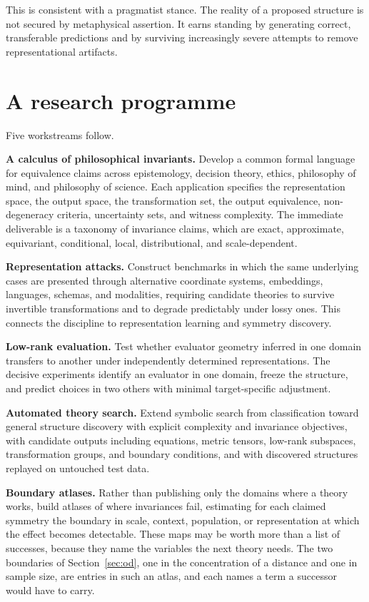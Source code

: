 \documentclass[11pt]{article}
\theoremstyle{remark}
\begin{document}
This is consistent with a pragmatist stance. The reality of a proposed structure is
not secured by metaphysical assertion. It earns standing by generating correct,
transferable predictions and by surviving increasingly severe attempts to remove
representational artifacts.

\section{A research programme}

Five workstreams follow.

\textbf{A calculus of philosophical invariants.} Develop a common formal language
for equivalence claims across epistemology, decision theory, ethics, philosophy of
mind, and philosophy of science. Each application specifies the representation
space, the output space, the transformation set, the output equivalence,
non-degeneracy criteria, uncertainty sets, and witness complexity. The immediate
deliverable is a taxonomy of invariance claims, which are exact, approximate,
equivariant, conditional, local, distributional, and scale-dependent.

\textbf{Representation attacks.} Construct benchmarks in which the same underlying
cases are presented through alternative coordinate systems, embeddings, languages,
schemas, and modalities, requiring candidate theories to survive invertible
transformations and to degrade predictably under lossy ones. This connects the
discipline to representation learning and symmetry discovery.

\textbf{Low-rank evaluation.} Test whether evaluator geometry inferred in one domain
transfers to another under independently determined representations. The decisive
experiments identify an evaluator in one domain, freeze the structure, and predict
choices in two others with minimal target-specific adjustment.

\textbf{Automated theory search.} Extend symbolic search from classification toward
general structure discovery with explicit complexity and invariance objectives, with
candidate outputs including equations, metric tensors, low-rank subspaces,
transformation groups, and boundary conditions, and with discovered structures
replayed on untouched test data.

\textbf{Boundary atlases.} Rather than publishing only the domains where a theory
works, build atlases of where invariances fail, estimating for each claimed symmetry
the boundary in scale, context, population, or representation at which the effect
becomes detectable. These maps may be worth more than a list of successes, because
they name the variables the next theory needs. The two boundaries of
Section~\ref{sec:od}, one in the concentration of a distance and one in sample size,
are entries in such an atlas, and each names a term a successor would have to carry.
\end{document}
